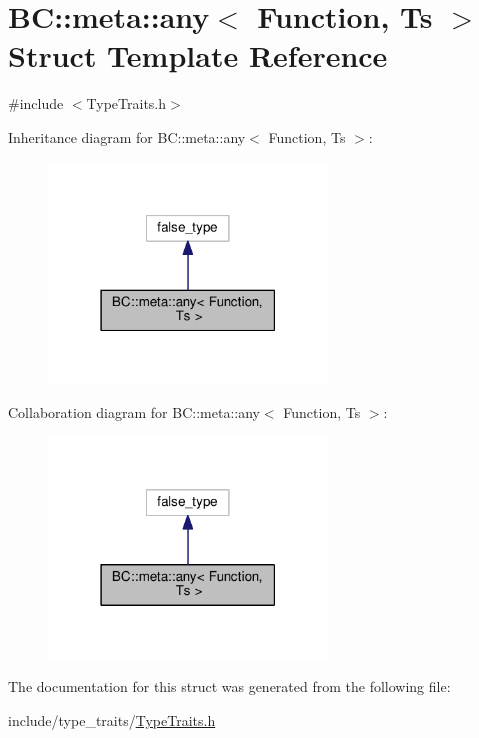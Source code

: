 \hypertarget{structBC_1_1meta_1_1any}{}\section{BC\+:\+:meta\+:\+:any$<$ Function, Ts $>$ Struct Template Reference}
\label{structBC_1_1meta_1_1any}


{\ttfamily \#include $<$Type\+Traits.\+h$>$}



Inheritance diagram for BC\+:\+:meta\+:\+:any$<$ Function, Ts $>$\+:
\nopagebreak
\begin{figure}[H]
\begin{center}
\leavevmode
\includegraphics[width=210pt]{structBC_1_1meta_1_1any__inherit__graph}
\end{center}
\end{figure}


Collaboration diagram for BC\+:\+:meta\+:\+:any$<$ Function, Ts $>$\+:
\nopagebreak
\begin{figure}[H]
\begin{center}
\leavevmode
\includegraphics[width=210pt]{structBC_1_1meta_1_1any__coll__graph}
\end{center}
\end{figure}


The documentation for this struct was generated from the following file\+:\begin{DoxyCompactItemize}
\item 
include/type\+\_\+traits/\hyperlink{TypeTraits_8h}{Type\+Traits.\+h}\end{DoxyCompactItemize}
